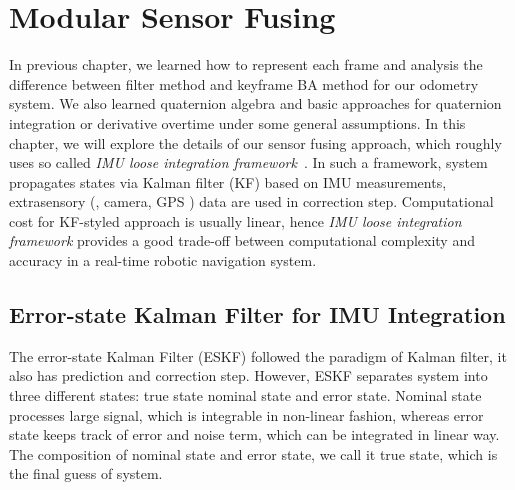 \chapter{Modular Sensor Fusing}
\label{chap:sensor_fusing}

In previous chapter, we learned how to represent each frame and analysis the difference between filter method and keyframe BA method for our odometry system. We also learned quaternion algebra and basic approaches for quaternion integration or derivative overtime under some general assumptions. In this chapter, we will explore the details of our sensor fusing approach, which roughly uses so called \textit{IMU loose integration framework}~\cite{weiss2012vision}. In such a framework, system propagates states via Kalman filter (KF) based on IMU measurements, extrasensory (\eg, camera, GPS \etc) data are used in correction step. Computational cost for KF-styled approach is usually linear, hence \textit{IMU loose integration framework} provides a good trade-off between computational complexity and accuracy in a real-time robotic navigation system.

\section{Error-state Kalman Filter for IMU Integration}
\label{sec:ESKF_IMU}

The error-state Kalman Filter (ESKF) followed the paradigm of Kalman filter, it also has prediction and correction step. However, ESKF separates system into three different states: true state nominal state and error state. Nominal state processes large signal, which is integrable in non-linear fashion, whereas error state
keeps track of error and noise term, which can be integrated in linear way. The composition of nominal state and error state, we call it true state, which is the final guess of system.


